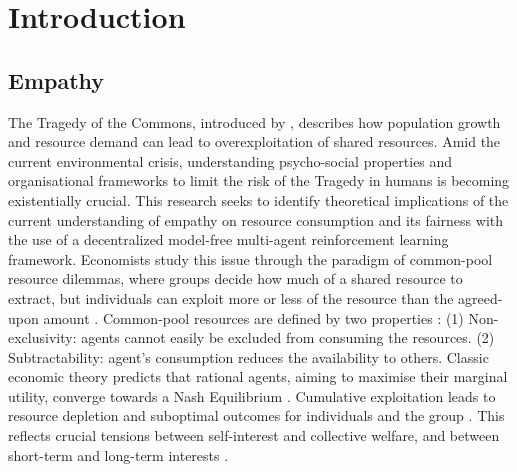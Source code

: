 \section{Introduction}
\subsection{Empathy}
The Tragedy of the Commons, introduced by \cite{hardinTragedyCommonsPopulation1968}, describes how population growth and resource demand can lead to overexploitation of shared resources. Amid the current environmental crisis, understanding psycho-social properties and organisational frameworks to limit the risk of the Tragedy in humans is becoming existentially crucial. This research seeks to identify theoretical implications of the current understanding of empathy on resource consumption and its fairness with the use of a decentralized model-free multi-agent reinforcement learning framework.
Economists study this issue through the paradigm of common-pool resource dilemmas, where groups decide how much of a shared resource to extract, but individuals can exploit more or less of the resource than the agreed-upon amount \cite{patelModellingCooperationCompetition2021}. Common-pool resources are defined by two properties \cite{ostromRevisitingCommonsLocal1999,perolatMultiagentReinforcementLearning2017}:
(1) Non-exclusivity: agents cannot easily be excluded from consuming the resources.
(2) Subtractability: agent's consumption reduces the availability to others.
Classic economic theory predicts that rational agents, aiming to maximise their marginal utility, converge towards a Nash Equilibrium \cite{nashEquilibriumPointsPerson1950}. Cumulative exploitation leads to resource depletion and suboptimal outcomes for individuals and the group \cite{patelModellingCooperationCompetition2021}. This reflects crucial tensions between self-interest and collective welfare, and between short-term and long-term interests \cite{vanlangeHowWeCan2008}.


